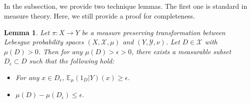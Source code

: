 \documentclass[reqno,12pt]{amsart}
\newtheorem{lemma}[thm]{Lemma}
\def \N {\mathbb N}
\def \E {\mathbb E}
\def \X {\mathcal{X}}
\def \Y {\mathcal{Y}}
\def \ep {\epsilon}
\numberwithin{equation}{section}
\begin{document}
\subsection{}
In the subsection, we provide two technique lemmas.
%
%
The first one is standard in measure theory. Here, we still provide a proof for completeness.
\begin{lemma}\label{lem2}
	Let $\pi:X\to Y$ be a measure preserving transformation between Lebesgue probability spaces $(X,\X,\mu)$ and $(Y,\Y,\nu)$. Let $D\in \X$ with $\mu(D)>0$. Then for any $\mu(D)>\epsilon>0$, there exists a measurable subset $D_{\ep}\subset D$ such that the following hold:
	\begin{itemize}
		\item For any $x\in D_{\ep}$, $\E_{\mu}(1_{D}|Y)(x)\ge \ep$.
		\item $\mu(D)-\mu(D_{\ep})\le\ep$.
	\end{itemize}
\end{lemma}
\end{document}
